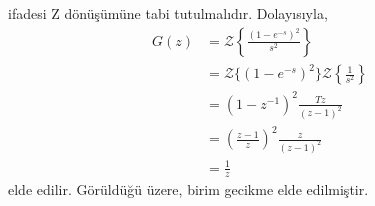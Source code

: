ifadesi Z dönüşümüne tabi tutulmalıdır. Dolayısıyla,
\begin{equation}
    \begin{split}
        G(z)&=\mathcal{Z}\left\{\frac{(1-e^{-s})^2}{s^2}\right\}\\
        &=\mathcal{Z}\{(1-e^{-s})^2\}\mathcal{Z}\left\{\frac{1}{s^2}\right\}\\
        &=\left(1-z^{-1}\right)^2\frac{Tz}{(z-1)^2}\\
        &=\left(\frac{z-1}{z}\right)^2\frac{z}{(z-1)^2}\\
        &=\frac{1}{z}
    \end{split}\label{eqn:ornek_sistem_foh}
\end{equation}
elde edilir. Görüldüğü üzere, birim gecikme elde edilmiştir.